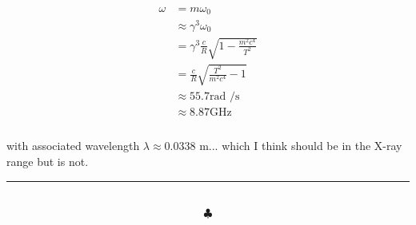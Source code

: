 \documentclass[]{article}
\begin{document}
\begin{equation}
\begin{aligned}
\omega & = m \omega_0 \\
& \approx \gamma^3 \omega_0 \\
& = \gamma^3 \frac{c}{R} \sqrt{ 1 - \frac{ m^2 c^4 }{ T^2 }} \\
& = \frac{ c }{R} \sqrt{  \frac{ T^2 }{ m^2 c^4 } - 1 }\\
& \approx 55.7 \text{rad /s} \\
& \approx 8.87 \text{GHz} \\
\end{aligned} 
\end{equation} \\

with associated wavelength $\lambda \approx  0.0338 $ m... which I think should be in the X-ray range but is not. \\

















\newpage



\noindent\rule{15cm}{0.4pt} \\

$$\clubsuit$$
\end{document}
